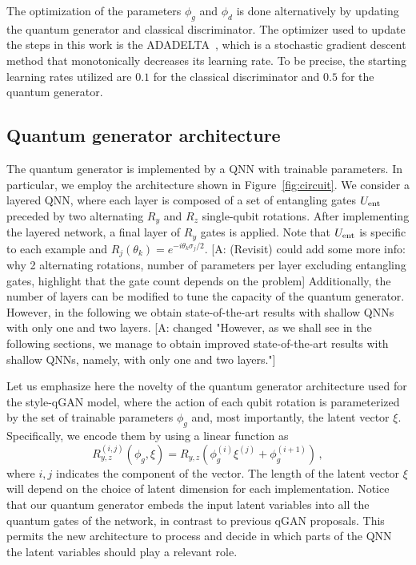 \documentclass[twocolumn,preprintnumbers,superscriptaddress]{revtex4-2}
\newcommand{\commentAF}[1]{{\color{cyan} {[A: #1]}}}
\begin{document}
The optimization of the parameters $\phi_g$ and $\phi_d$ is done alternatively by updating the quantum generator and classical discriminator. The optimizer used to update the steps in this work is the ADADELTA~\cite{zeiler2012adadelta}, which is a stochastic gradient descent method that monotonically decreases its learning rate. To be precise, the starting learning rates utilized are $0.1$ for the classical discriminator and $0.5$ for the quantum generator.

\subsection{Quantum generator architecture}
The quantum generator is implemented by a QNN with trainable parameters. In particular, we employ the architecture shown in Figure~\ref{fig:circuit}. We consider a layered QNN, where each layer is composed of a set of entangling gates $U_{\rm ent}$ preceded by two alternating $R_y$ and $R_z$ single-qubit rotations. After implementing the layered network, a final layer of $R_y$ gates is applied. Note that $U_{\rm ent}$ is specific to each example and $R_j(\theta_k) = e^{-i\theta_k \sigma_j /2}$. \commentAF{(Revisit) could add some more info: why 2 alternating rotations, number of parameters per layer excluding entangling gates, highlight that the gate count depends on the problem}
Additionally, the number of layers can be modified to tune the capacity of the quantum generator. However, in the following we obtain state-of-the-art results with shallow QNNs with only one and two layers.
\commentAF{changed "However, as we shall see in the following sections, we manage to obtain improved state-of-the-art results with shallow QNNs, namely, with only one and two layers."}

Let us emphasize here the novelty of the quantum generator architecture used for the style-qGAN model, where the action of each qubit rotation is parameterized by the set of trainable parameters $\phi_g$ and, most importantly, the latent vector $\xi$. Specifically, we encode them by using a linear function as
\begin{equation}
    \label{eq:rotation} R_{y,z}^{(i,j)}\left(\phi_g, \xi\right) = R_{y,z}\left(\phi_g^{(i)} \xi^{(j)} + \phi_g^{(i+1)}\right)\,,
\end{equation}
where $i,j$ indicates the component of the vector. The length of the latent vector $\xi$ will depend on the choice of latent dimension for each implementation. Notice that our quantum generator embeds the input latent variables into all the quantum gates of the network, in contrast to previous qGAN proposals. This permits the new architecture to process and decide in which
parts of the QNN the latent variables should play a relevant role.
\end{document}
